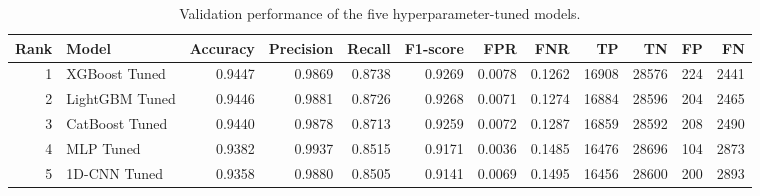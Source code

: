 \begin{table}
\caption{Validation performance of the five hyperparameter-tuned models.}
\label{tab:tuned_top5}
\begin{tabular}{rlrrrrrrrrrr}
\toprule
Rank & Model & Accuracy & Precision & Recall & F1-score & FPR & FNR & TP & TN & FP & FN \\
\midrule
1 & XGBoost Tuned & 0.9447 & 0.9869 & 0.8738 & 0.9269 & 0.0078 & 0.1262 & 16908 & 28576 & 224 & 2441 \\
2 & LightGBM Tuned & 0.9446 & 0.9881 & 0.8726 & 0.9268 & 0.0071 & 0.1274 & 16884 & 28596 & 204 & 2465 \\
3 & CatBoost Tuned & 0.9440 & 0.9878 & 0.8713 & 0.9259 & 0.0072 & 0.1287 & 16859 & 28592 & 208 & 2490 \\
4 & MLP Tuned & 0.9382 & 0.9937 & 0.8515 & 0.9171 & 0.0036 & 0.1485 & 16476 & 28696 & 104 & 2873 \\
5 & 1D-CNN Tuned & 0.9358 & 0.9880 & 0.8505 & 0.9141 & 0.0069 & 0.1495 & 16456 & 28600 & 200 & 2893 \\
\bottomrule
\end{tabular}
\end{table}
